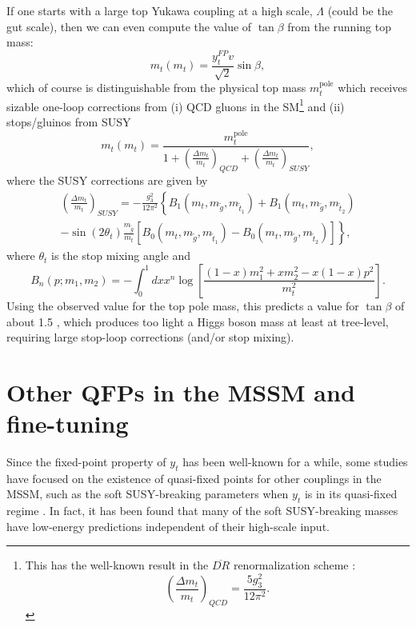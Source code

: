 If one starts with a large top Yukawa coupling at a high scale, $\Lambda$ (could be the \acrshort{gut} scale), then we can even compute the value of $\tan \beta$ from the running top mass:
\begin{equation}
m_t(m_t)=\frac{y^{FP}_t v}{\sqrt{2}} \sin \beta,
\end{equation}
which of course is distinguishable from the physical top mass $m^{\text{pole}}_t$ which receives sizable one-loop corrections from (i) QCD gluons in the SM\footnote{This has the well-known result in the $\overline{DR}$ renormalization scheme \cite{RN741}:
\begin{equation}
\left(\frac{\Delta m_t}{m_t}\right)_{QCD}=\frac{5g^2_3}{12 \pi^2}.
\end{equation}}
and (ii) stops/gluinos from SUSY
\begin{equation}
m_t (m_t)= \frac{m^{\text{pole}}_t}{1 + \left(\frac{\Delta m_t}{m_t}\right)_{QCD} + \left(\frac{\Delta m_t}{m_t}\right)_{SUSY}},
\end{equation}
where the SUSY corrections are given by \cite{RN741,RN742,RN743,RN744,RN745}
\begin{eqnarray}
\left(\frac{\Delta m_t}{m_t}\right)_{SUSY}=-\frac{g^2_3}{12 \pi^2} \left\{ B_1 (m_t,m_{\tilde{g}},m_{\tilde{t}_1}) +B_1 (m_t,m_{\tilde{g}},m_{\tilde{t}_2}) \right. \\
\left. -\sin(2\theta_t)\frac{m_{\tilde{g}}}{m_t}\left[ B_0 (m_t,m_{\tilde{g}},m_{\tilde{t}_1}) -B_0 (m_t,m_{\tilde{g}},m_{\tilde{t}_2})\right] \right\},
\end{eqnarray}
where $\theta_t$ is the stop mixing angle and
\begin{equation}
B_n (p;m_1,m_2)=-\int^1_0 dx x^n \log \left[ \frac{(1-x)m^2_1+xm^2_2-x(1-x)p^2}{m^2_t}\right].
\end{equation}
Using the observed value for the top pole mass, this predicts a value for $\tan \beta$ of about 1.5 \cite{RN740}, which produces too light a Higgs boson mass at least at tree-level, requiring large stop-loop corrections (and/or stop mixing).

\section{Other QFPs in the MSSM and fine-tuning}
\label{sec:QFPMSSM}

Since the fixed-point property of $y_t$ has been well-known for a while, some studies have focused on the existence of quasi-fixed points for other couplings in the MSSM, such as the soft SUSY-breaking parameters when $y_t$ is in its quasi-fixed regime \cite{RN285,RN255,RN256,RN249,RN250,RN251}. In fact, it has been found that many of the soft SUSY-breaking masses have low-energy predictions independent of their high-scale input.

